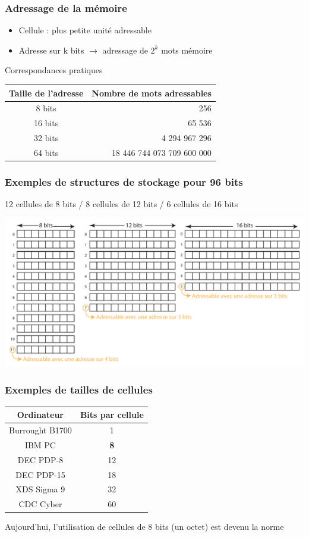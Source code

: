 \begin{frame}
\frametitle{Adressage de la mémoire}
\begin{itemize}
\item Cellule : plus petite unité adressable
\item Adresse sur k bits $\rightarrow$ adressage de $2^k$ mots mémoire
\end{itemize}

\begin{block}{Correspondances pratiques}
\begin{tabular}{c|r}
Taille de l'adresse & Nombre de mots adressables \\
\hline
8 bits & 256 \\
16 bits & 65 536 \\
32 bits & 4 294 967 296 \\
64 bits & 18 446 744 073 709 600 000 \\
\end{tabular}
\end{block}
\end{frame}


\begin{frame}
\frametitle{Exemples de structures de stockage pour 96 bits}
12 cellules de 8 bits / 8 cellules de 12 bits / 6 cellules de 16 bits

\includegraphics[width=\textwidth]{../illustration/stockage96bits.pdf}
\end{frame}

\begin{frame}
\frametitle{Exemples de tailles de cellules}
\begin{table}[htdp]
\begin{center}
\begin{tabular}{|c|c|}
\hline
Ordinateur & Bits par cellule \\
\hline
Burrought B1700 & 1 \\
IBM PC & \textbf{8} \\
DEC PDP-8 & 12 \\
DEC PDP-15 & 18 \\
XDS Sigma 9 & 32 \\
CDC Cyber & 60 \\
\hline
\end{tabular}
\end{center}
\label{default}
\end{table}
Aujourd'hui, l'utilisation de cellules de 8 bits (un octet) est devenu la norme
\end{frame}

